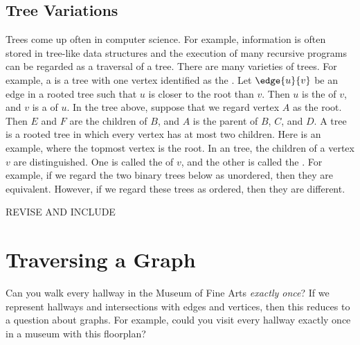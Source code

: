 \subsection{Tree Variations}
Trees come up often in computer science.  For example, information is
often stored in tree-like data structures and the execution of many
recursive programs can be regarded as a traversal of a tree.
There are many varieties of trees.  For example, a 
is a tree with one vertex identified as the .  Let
$\edge{u}{v}$ be an edge in a rooted tree such that $u$ is closer to
the root than $v$.  Then $u$ is the  of $v$, and $v$ is
a  of $u$.
In the tree above, suppose that we regard vertex $A$ as the
root.  Then $E$ and $F$ are the children of $B$, and $A$ is the parent
of $B$, $C$, and $D$.
A  tree is a rooted tree in which every vertex has at most
two children.  Here is an example, where the topmost vertex is the
root.
In an  tree, the children of a vertex $v$ are
distinguished.  One is called the  of $v$, and the
other is called the .  For example, if we regard the
two binary trees below as unordered, then they are equivalent.
However, if we regard these trees as ordered, then they are different.
\fi

\iffalse  REVISE AND INCLUDE
\section{Traversing a Graph}
Can you walk every hallway in the Museum of Fine Arts {\em exactly
once}?  If we represent hallways and intersections with edges and
vertices, then this reduces to a question about graphs.  For example,
could you visit every hallway exactly once in a museum with this
floorplan?


